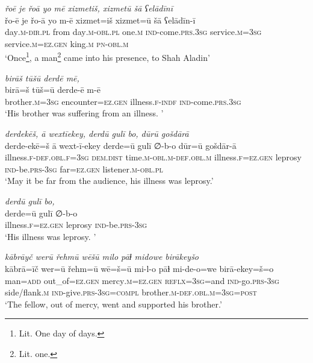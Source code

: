 \ea \label{DG.11}
\textit{řoē je řoā yo mē xizmetiš, xizmetū šā ʕelādīnī} \\ 
\gll řo-ē je řo-ā yo m-ē xizmet=iš xizmet=ū šā ʕelādīn-ī \\ 
 day\textsc{.m}\textsc{-dir}\textsc{.pl} from day\textsc{.m}\textsc{-obl}\textsc{.pl} one\textsc{.m} \textsc{ind-}come\textsc{.prs}\textsc{.3sg} service\textsc{.m}\textsc{=3sg} service\textsc{.m}\textsc{=ez}\textsc{.gen} king\textsc{.m} \textsc{pn}\textsc{-obl}\textsc{.m} \\ 
\glt `Once\footnote{Lit. One day of days.}, a man\footnote{Lit. one.}  came into his presence, to Shah Aladin'
\z 
 
\ea \label{DG.12}
\textit{birāš tūšū derdē mē,} \\ 
\gll birā=š tūš=ū derde-ē m-ē \\ 
 brother\textsc{.m}\textsc{=3sg} encounter\textsc{=ez}\textsc{.gen} illness\textsc{\textsc{.f}}\textsc{-indf} \textsc{ind-}come\textsc{.prs}\textsc{.3sg} \\ 
\glt `His brother was suffering from an illness.  '
\z 
 
\ea \label{DG.13}
\textit{derdekēš, ā wextīekey, derdū gulī bo, dūrū gošdārā} \\ 
\gll derde-ekē=š ā wext-ī-ekey derde=ū gulī ∅-b-o dūr=ū gošdār-ā \\ 
 illness\textsc{\textsc{.f}}\textsc{-def}\textsc{.obl}\textsc{\textsc{.f}}\textsc{=3sg} \textsc{dem.dist} time\textsc{.m}\textsc{-obl}\textsc{.m}\textsc{-def}\textsc{.obl}\textsc{.m} illness\textsc{\textsc{.f}}\textsc{=ez}\textsc{.gen} leprosy \textsc{ind-}be\textsc{.prs}\textsc{-3sg} far\textsc{=ez}\textsc{.gen} listener\textsc{.m}\textsc{-obl}\textsc{.pl} \\ 
\glt `May it be far from the audience, his illness was leprosy.'
\z 
 
\ea \label{DG.14}
\textit{derdū gulī bo,} \\ 
\gll derde=ū gulī ∅-b-o \\ 
 illness\textsc{\textsc{.f}}\textsc{=ez}\textsc{.gen} leprosy \textsc{ind-}be\textsc{.prs}\textsc{-3sg} \\ 
\glt `His illness was leprosy. '
\z 
 
\ea \label{DG.16}
\textit{kābrāyč werū řehmū wēšū milo pāɫ midowe birākeyšo} \\ 
\gll kābrā=īč wer=ū řehm=ū wē=š=ū mi-l-o pāɫ mi-de-o=we birā-ekey=š=o \\ 
 man\textsc{=add} out\_of\textsc{=ez}\textsc{.gen} mercy\textsc{.m}\textsc{=ez}\textsc{.gen} \textsc{reflx}\textsc{=3sg}=and \textsc{ind-}go\textsc{.prs}\textsc{-3sg} side/flank\textsc{.m} \textsc{ind-}give\textsc{.prs}\textsc{-3sg}\textsc{=\textsc{compl}} brother\textsc{.m}\textsc{-def}\textsc{.obl}\textsc{.m}\textsc{=3sg}\textsc{=\textsc{post}} \\ 
\glt `The fellow, out of mercy, went and supported his brother.'
\z 
 
